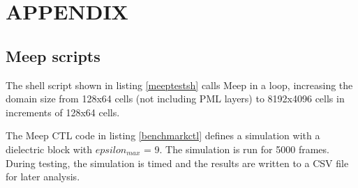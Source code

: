 
\chapter{APPENDIX} \label{ch:table appendix}







\section{Meep scripts}

The shell script shown in listing \ref{meeptestsh} calls Meep in a loop, increasing the domain size from 128x64 cells (not including PML layers) to 8192x4096 cells in increments of 128x64 cells. 




The Meep CTL code in listing \ref{benchmarkctl} defines a simulation with a dielectric block with $epsilon_{max}$ = 9. The simulation is run for 5000 frames. During testing, the simulation is timed and the results are written to a CSV file for later analysis. 




